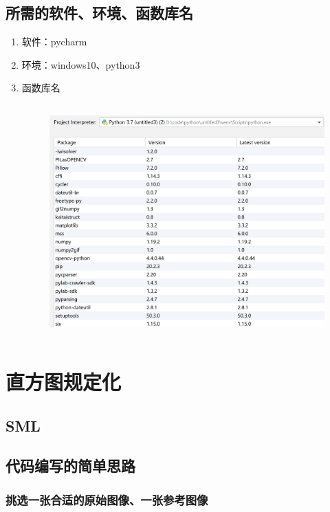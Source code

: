 \documentclass{article}
\begin{document}
\subsection{所需的软件、环境、函数库名}

\begin{enumerate}
    \item 软件：pycharm
    \item 环境：windows10、python3
    \item 函数库名
    \begin{figure}[h!]
                \centering
                \includegraphics[width=14cm,height=9cm]{python.png}

\vskip 12cm
    \end{figure}

\end{enumerate}
\clearpage
\newpage
\section{直方图规定化}
\subsection{SML}
\subsection{代码编写的简单思路}
\subsubsection{挑选一张合适的原始图像、一张参考图像}
\end{document}
